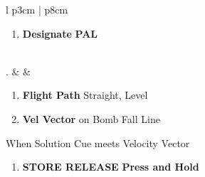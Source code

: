 \documentclass[8pt,usenames,dvipsnames,twoside]{article}
\begin{document}
\begin{center}
\begin{tabular}{l p{3cm} | p{8cm}}
\begin{minipage}[t]{\linewidth}
\begin{enumerate}
					\item \textbf{Designate} \dotfill \textbf{PAL}
				\end{enumerate}
			\end{minipage} \\
			. &  &
			\begin{minipage}[t]{\linewidth}
				\vspace{-7pt}
				\begin{enumerate}
					\item \textbf{Flight Path} \dotfill Straight, Level
					\item \textbf{Vel Vector} \dotfill on Bomb Fall Line
				\end{enumerate}
				When Solution Cue meets Velocity Vector
				\begin{enumerate}[label=(\alph*), resume]
					\item \textbf{STORE RELEASE} \dotfill \textbf{Press and Hold}
				\end{enumerate}
			\end{minipage} \\
			\bottomrule
		\end{tabular}
	\end{center}

	\clearpage
\end{document}
